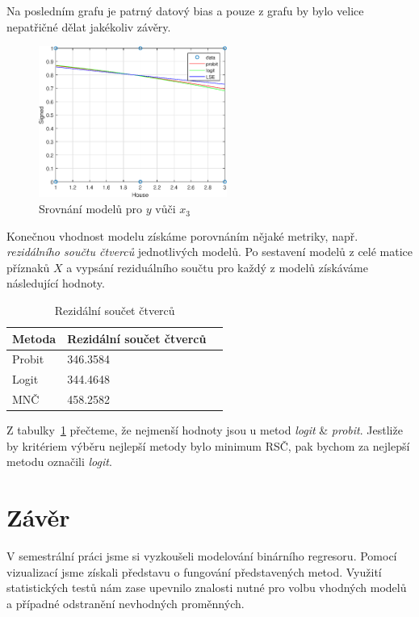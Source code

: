 Na posledním grafu je patrný datový bias a pouze z grafu by bylo velice nepatřičné dělat jakékoliv závěry.

\begin{figure}[htb]
    \centering
    \includegraphics[width=0.55\textwidth]{graphs/fig4.eps}
    \caption{Srovnání modelů pro \( y \) vůči \( x_3 \)}
    \label{fig:lr4}
\end{figure}
\FloatBarrier

Konečnou vhodnost modelu získáme porovnáním nějaké metriky, např. \textit{rezidálního součtu čtverců} jednotlivých modelů.
Po sestavení modelů z celé matice příznaků \( X \) a vypsání reziduálního součtu pro každý z modelů získáváme následující hodnoty.

\begin{table}[htb]
    \centering

    \begin{tabular}{lll}
        \toprule

        Metoda  & Rezidální součet čtverců  \\ \midrule
        Probit  & 346.3584                  \\
        Logit   & 344.4648                  \\
        MNČ     & 458.2582                  \\
          
        \bottomrule
    \end{tabular}

    \caption{Rezidální součet čtverců}
    \label{table:table1}
\end{table}
\FloatBarrier

Z tabulky~\ref{table:table1} přečteme, že nejmenší hodnoty jsou u metod \textit{logit} \& \textit{probit}.
Jestliže by kritériem výběru nejlepší metody bylo minimum RSČ, pak bychom za nejlepší metodu označili \textit{logit}.

\section{Závěr}

V semestrální práci jsme si vyzkoušeli modelování binárního regresoru.
Pomocí vizualizací jsme získali představu o fungování představených metod.
Využití statistických testů nám zase upevnilo znalosti nutné pro volbu vhodných modelů a případné odstranění nevhodných proměnných.
